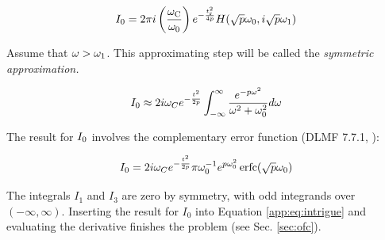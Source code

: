 \documentclass[amsmath,amssymb,aps,prd,10pt,twocolumn]{revtex4}
\DeclareMathOperator\erfc{erfc}
\begin{document}
\begin{equation}
I_{\rm 0} = 2 \pi i \left( \frac{\omega_{\rm C}}{\omega_{\rm 0}} \right) e^{- \frac{t_{\rm r}^2}{4p}} H(\sqrt{p}\omega_0,i\sqrt{p}\omega_1)
\end{equation}

Assume that $\omega > \omega_{\rm 1}$.  This approximating step will be called the \textit{symmetric approximation.}

\begin{equation}
I_{\rm 0} \approx 2 i \omega_C e^{- \frac{t_{\rm}^2}{2p}} \int_{-\infty}^{\infty} \frac{e^{-p\omega^2}}{\omega^2+\omega_0^2}d\omega \label{app:eq:intrigue4}
\end{equation}

The result for $I_{\rm 0}$ involves the complementary error function (DLMF 7.7.1, \cite{NIST:DLMF}):

\begin{equation}
I_{\rm 0} = 2 i \omega_C e^{- \frac{t_{\rm}^2}{2p}} \pi \omega_{\rm 0}^{-1} e^{p \omega_{\rm 0}^2} \erfc(\sqrt{p} \omega_{\rm 0}) \label{app:eq:intrigue5}
\end{equation}

The integrals $I_1$ and $I_3$ are zero by symmetry, with odd integrands over $(-\infty,\infty)$.  Inserting the result for $I_0$ into Equation \ref{app:eq:intrigue} and evaluating the derivative finishes the problem (see Sec. \ref{sec:ofc}).


\end{document}
